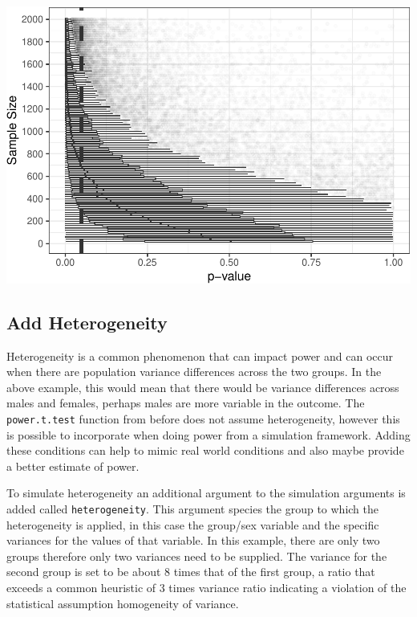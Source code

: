 \documentclass[man,mask,floatsintext]{apa6}
\begin{document}
\includegraphics{power_simulation_files/figure-latex/p-value-figure-1.pdf}

\hypertarget{add-heterogeneity}{%
\subsection{Add Heterogeneity}\label{add-heterogeneity}}

Heterogeneity is a common phenomenon that can impact power and can occur when there are population variance differences across the two groups. In the above example, this would mean that there would be variance differences across males and females, perhaps males are more variable in the outcome. The \texttt{power.t.test} function from before does not assume heterogeneity, however this is possible to incorporate when doing power from a simulation framework. Adding these conditions can help to mimic real world conditions and also maybe provide a better estimate of power.

To simulate heterogeneity an additional argument to the simulation arguments is added called \texttt{heterogeneity}. This argument species the group to which the heterogeneity is applied, in this case the group/sex variable and the specific variances for the values of that variable. In this example, there are only two groups therefore only two variances need to be supplied. The variance for the second group is set to be about 8 times that of the first group, a ratio that exceeds a common heuristic of 3 times variance ratio indicating a violation of the statistical assumption homogeneity of variance.
\end{document}
